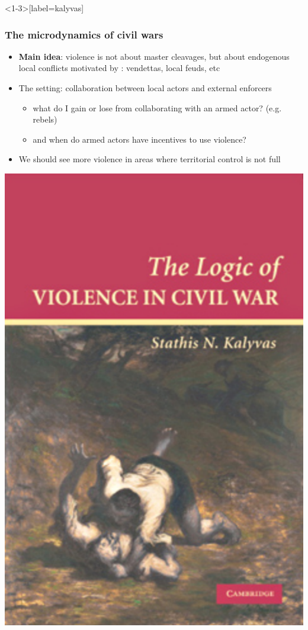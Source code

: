 \documentclass[aspectratio=43]{beamer}
\begin{document}
\begin{frame}<1-3>[label=kalyvas]
\frametitle{The microdynamics of civil wars}
\centering

\begin{minipage}{0.69\textwidth}\centering
\begin{itemize}
  \item<2-> \textbf{Main idea}: violence is not about master cleavages, but about endogenous local conflicts motivated by : vendettas, local feuds, etc
  \item<3-> The setting: collaboration between local actors and external enforcers
  \begin{itemize}
    \item what do I gain or lose from collaborating with an armed actor? (e.g. rebels)
    \item and when do armed actors have incentives to use violence?
  \end{itemize}
  \item<4-> We should see more violence in areas where territorial control is not full
\end{itemize}
\end{minipage}\hfill
\begin{minipage}{0.3\textwidth}\centering
\includegraphics[width = \textwidth]{img/kalyvas2006}\\

\end{minipage}
\end{frame}
\end{document}
